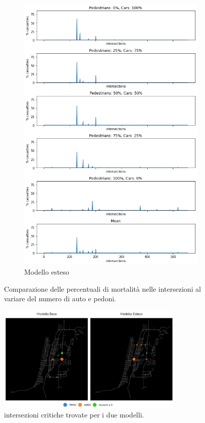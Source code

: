 \begin{figure}[p]
\begin{subfigure}{0.45\textwidth}
        \includegraphics[width=\textwidth]{images/analisi/comparison-critical-ints-new.png}
        \caption{Modello esteso}
        \label{fig:new-ints-casualties}
    \end{subfigure}
    \caption{Comparazione delle percentuali di mortalità nelle intersezioni al variare del numero di auto e pedoni.}
    \label{fig:analisi-comparison-critical-ints1}
\end{figure}

\begin{figure}[p]
    \centering
    \includegraphics[width=0.8\textwidth]{images/analisi/critical_ints_map.png}
    \caption{intersezioni critiche trovate per i due modelli.}
    \label{fig:analisi-comparison-critical-ints2}
\end{figure}



